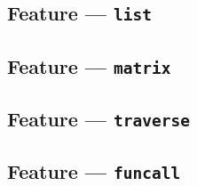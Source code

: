 
\subsection{Feature --- \texttt{list}} %
\label{sub:feature_list}


\subsection{Feature --- \texttt{matrix}} %
\label{sub:feature_matrix}


\subsection{Feature --- \texttt{traverse}} %
\label{sub:feature_traverse}


\subsection{Feature --- \texttt{funcall}} %
\label{sub:feature_funcall}



